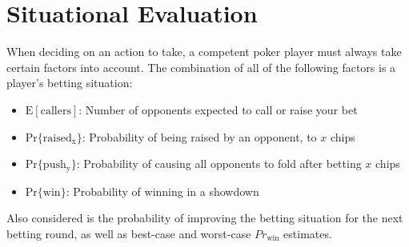 
\clearpage




\chapter{Situational Evaluation}
\label{sec:SituationalEvaluation}

When deciding on an action to take, a competent poker player must always take certain factors into account.
The combination of all of the following factors is a player's betting situation:
\begin{itemize}
\singlespacing
\item $\mathrm{E[callers]}$: Number of opponents expected to call or raise your bet
\item $\mathrm{Pr\{raised_x\}}$: Probability of being raised by an opponent, to $x$ chips
\item $\mathrm{Pr\{push_y\}}$: Probability of causing all opponents to fold after betting $x$ chips
\item $\mathrm{Pr\{win\}}$: Probability of winning in a showdown
\end{itemize}
Also considered is the probability of improving the betting situation for the next betting round, as well as best-case and worst-case $Pr_\mathrm{win}$ estimates.



\clearpage
